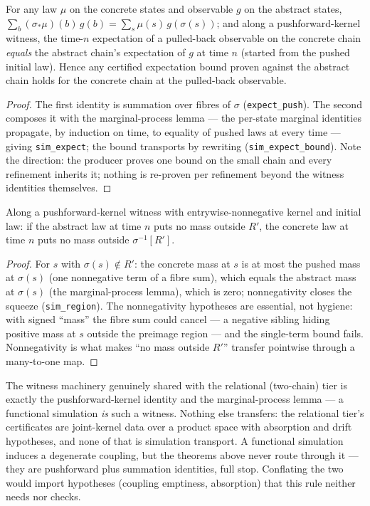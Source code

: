 \begin{blemma}\label{lem:qst-expect}
For any law $\mu$ on the concrete states and observable $g$ on the
abstract states,
$\sum_b (\sigma_{*}\mu)(b) \, g(b) = \sum_s \mu(s) \, g(\sigma(s))$;
and along a pushforward-kernel witness, the time-$n$ expectation of a
pulled-back observable on the concrete chain \emph{equals} the
abstract chain's expectation of $g$ at time $n$ (started from the
pushed initial law). Hence any certified expectation bound proven
against the abstract chain holds for the concrete chain at the
pulled-back observable.
\end{blemma}
\begin{proof}
The first identity is summation over fibres of $\sigma$
(\texttt{expect\_push}). The second composes it with the
marginal-process lemma --- the per-state marginal identities
propagate, by induction on time, to equality of pushed laws at every
time --- giving \texttt{sim\_expect}; the bound transports by
rewriting (\texttt{sim\_expect\_bound}). Note the direction: the
producer proves one bound on the small chain and every refinement
inherits it; nothing is re-proven per refinement beyond the witness
identities themselves.
\end{proof}

\begin{blemma}\label{lem:qst-region}
Along a pushforward-kernel witness with entrywise-nonnegative kernel
and initial law: if the abstract law at time $n$ puts no mass outside
$R'$, the concrete law at time $n$ puts no mass outside
$\sigma^{-1}[R']$.
\end{blemma}
\begin{proof}
For $s$ with $\sigma(s) \notin R'$: the concrete mass at $s$ is at
most the pushed mass at $\sigma(s)$ (one nonnegative term of a
fibre sum), which equals the abstract mass at $\sigma(s)$ (the
marginal-process lemma), which is zero; nonnegativity closes the
squeeze (\texttt{sim\_region}). The nonnegativity hypotheses are
essential, not hygiene: with signed ``mass'' the fibre sum could
cancel --- a negative sibling hiding positive mass at $s$ outside the
preimage region --- and the single-term bound fails. Nonnegativity is
what makes ``no mass outside $R'$'' transfer pointwise through a
many-to-one map.
\end{proof}

\begin{bremark}\label{rem:qst-onesided}
The witness machinery genuinely shared with the relational
(two-chain) tier is exactly the pushforward-kernel identity and the
marginal-process lemma --- a functional simulation \emph{is} such a
witness. Nothing else transfers: the relational tier's certificates
are joint-kernel data over a product space with absorption and drift
hypotheses, and none of that is simulation transport. A functional
simulation induces a degenerate coupling, but the theorems above
never route through it --- they are pushforward plus summation
identities, full stop. Conflating the two would import hypotheses
(coupling emptiness, absorption) that this rule neither needs nor
checks.
\end{bremark}

